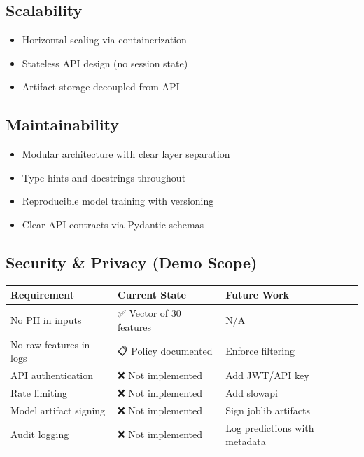 \documentclass[12pt,a4paper]{article}
\begin{document}
\subsection{Scalability}
\begin{itemize}
    \item Horizontal scaling via containerization
    \item Stateless API design (no session state)
    \item Artifact storage decoupled from API
\end{itemize}

\subsection{Maintainability}
\begin{itemize}
    \item Modular architecture with clear layer separation
    \item Type hints and docstrings throughout
    \item Reproducible model training with versioning
    \item Clear API contracts via Pydantic schemas
\end{itemize}

\subsection{Security \& Privacy (Demo Scope)}

\begin{table}[H]
\centering
\small
\begin{tabular}{|l|p{2.5cm}|l|}
\hline
\textbf{Requirement} & \textbf{Current State} & \textbf{Future Work} \\
\hline
No PII in inputs & ✅ Vector of 30 features & N/A \\
No raw features in logs & 📋 Policy documented & Enforce filtering \\
API authentication & ❌ Not implemented & Add JWT/API key \\
Rate limiting & ❌ Not implemented & Add slowapi \\
Model artifact signing & ❌ Not implemented & Sign joblib artifacts \\
Audit logging & ❌ Not implemented & Log predictions with metadata \\
\hline
\end{tabular}
\end{table}

\end{document}

